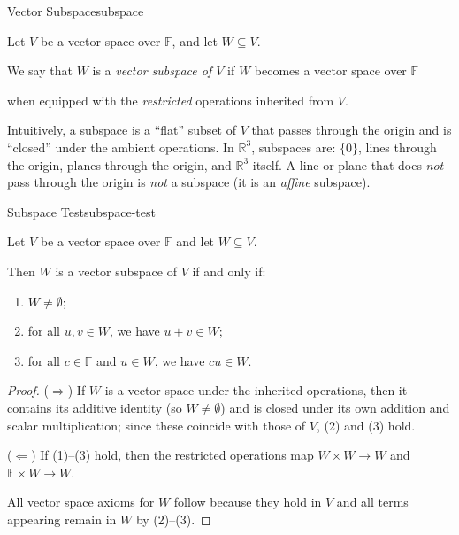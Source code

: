 \begin{definition}{Vector Subspace}{subspace}

Let $V$ be a vector space over $\mathbb{F}$, and let $W\subseteq V$.

We say that $W$ is a \emph{vector subspace of $V$} if $W$ becomes a vector space over $\mathbb{F}$

when equipped with the \emph{restricted} operations inherited from $V$.

\end{definition}

Intuitively, a subspace is a ``flat'' subset of $V$ that passes through the origin and is ``closed'' under the ambient operations.  In $\mathbb{R}^3$, subspaces are: $\{0\}$, lines through the origin, planes through the origin, and $\mathbb{R}^3$ itself.  A line or plane that does \emph{not} pass through the origin is \emph{not} a subspace (it is an \emph{affine} subspace).

\begin{theorem}{Subspace Test}{subspace-test}

Let $V$ be a vector space over $\mathbb{F}$ and let $W\subseteq V$.

Then $W$ is a vector subspace of $V$ if and only if:

\begin{enumerate}[label=(\arabic*), leftmargin=*]

\item $W\neq \emptyset$;

\item for all $u,v\in W$, we have $u+v\in W$;

\item for all $c\in\mathbb{F}$ and $u\in W$, we have $cu\in W$.

\end{enumerate}

\end{theorem}

\begin{proof}

($\Rightarrow$) If $W$ is a vector space under the inherited operations, then it contains its additive identity (so $W\neq\emptyset$) and is closed under its own addition and scalar multiplication; since these coincide with those of $V$, (2) and (3) hold.

($\Leftarrow$) If (1)--(3) hold, then the restricted operations map $W\times W\to W$ and $\mathbb{F}\times W\to W$.

All vector space axioms for $W$ follow because they hold in $V$ and all terms appearing remain in $W$ by (2)--(3).

\end{proof}

